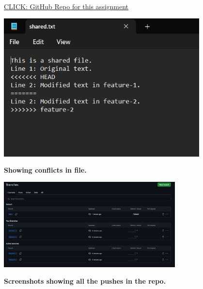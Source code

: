 \documentclass[a4paper,12pt]{article}
\begin{document}
\href{https://github.com/codeAtSin/git-advanced}{CLICK: GitHub Repo for this assignment}
\par\vspace{2em}
\includegraphics[width=0.8\textwidth]{conflictfile.png}
\par\vspace{2em}
\large\textbf{Showing conflicts in file.}
\par\vspace{2em}
\includegraphics[width=0.7\textwidth]{allpushes.png}
\par\vspace{2em}
\large\textbf{Screenshots showing all the pushes in the repo.}
\vspace{0.3in}

\newpage
\end{document}
